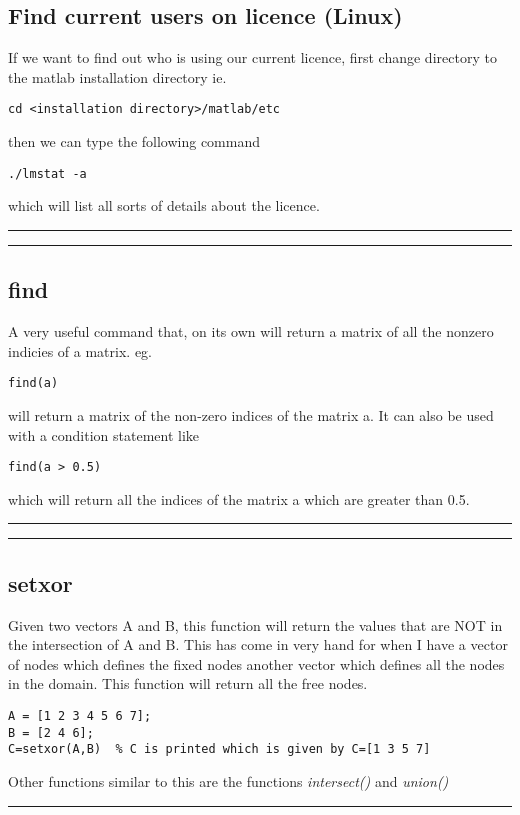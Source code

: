 \documentclass[a4paper, 10pt]{article}
\newcommand{\mytoprule}{\hrule\vspace{4mm}}
\newcommand{\mybotrule}{\vspace{4mm}\hrule}
\begin{document}
\subsection*{Find current users on licence (Linux)}
If we want to find out who is using our current licence, first change directory to the matlab installation directory ie.
\begin{Verbatim}[commandchars=\\\{\}]
cd <installation directory>/matlab/etc
\end{Verbatim}
then we can type the following command 
\begin{Verbatim}[commandchars=\\\{\}]
./lmstat -a
\end{Verbatim}
which will list all sorts of details about the licence. 
\mybotrule

\mytoprule
\subsection*{find}
A very useful command that, on its own will return a matrix of all the nonzero indicies of a matrix. eg. 
\begin{Verbatim}[commandchars=\\\{\}]
find(a)
\end{Verbatim}
will return a matrix of the non-zero indices of the matrix a. It can also be used with a condition statement like
\begin{Verbatim}[commandchars=\\\{\}]
find(a > 0.5)
\end{Verbatim}
which will return all the indices of the matrix a which are greater than 0.5.
\mybotrule

\mytoprule
\subsection*{setxor}
Given two vectors A and B, this function will return the values that are NOT in the intersection of A and B. This has come in very hand for when I have a vector of nodes which defines the fixed nodes another vector which defines all the nodes in the domain. This function will return all the free nodes. 
\begin{Verbatim}[commandchars=\\\{\}]
A = [1 2 3 4 5 6 7];
B = [2 4 6];
C=setxor(A,B)  % C is printed which is given by C=[1 3 5 7]
\end{Verbatim}
Other functions similar to this are the functions \emph{intersect()} and \emph{union()}
\mybotrule
\end{document}
